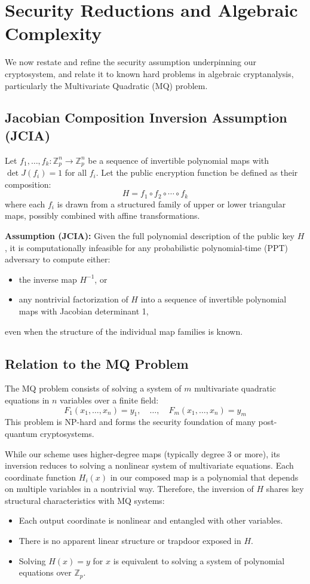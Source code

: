 \documentclass[12pt]{article}
\begin{document}
\section{Security Reductions and Algebraic Complexity}

We now restate and refine the security assumption underpinning our cryptosystem, and relate it to known hard problems in algebraic cryptanalysis, particularly the Multivariate Quadratic (MQ) problem.

\subsection*{Jacobian Composition Inversion Assumption (JCIA)}

Let \( f_1, \dots, f_k : \mathbb{Z}_p^n \rightarrow \mathbb{Z}_p^n \) be a sequence of invertible polynomial maps with \( \det J(f_i) = 1 \) for all \( f_i \). Let the public encryption function be defined as their composition:
\[
H = f_1 \circ f_2 \circ \cdots \circ f_k
\]
where each \( f_i \) is drawn from a structured family of upper or lower triangular maps, possibly combined with affine transformations.

\textbf{Assumption (JCIA):} Given the full polynomial description of the public key \( H \), it is computationally infeasible for any probabilistic polynomial-time (PPT) adversary to compute either:
\begin{itemize}
    \item the inverse map \( H^{-1} \), or
    \item any nontrivial factorization of \( H \) into a sequence of invertible polynomial maps with Jacobian determinant 1,
\end{itemize}
even when the structure of the individual map families is known.

\subsection*{Relation to the MQ Problem}

The MQ problem consists of solving a system of \( m \) multivariate quadratic equations in \( n \) variables over a finite field:
\[
F_1(x_1, \dots, x_n) = y_1, \quad \dots, \quad F_m(x_1, \dots, x_n) = y_m
\]
This problem is NP-hard and forms the security foundation of many post-quantum cryptosystems.

While our scheme uses higher-degree maps (typically degree 3 or more), its inversion reduces to solving a nonlinear system of multivariate equations. Each coordinate function \( H_i(x) \) in our composed map is a polynomial that depends on multiple variables in a nontrivial way. Therefore, the inversion of \( H \) shares key structural characteristics with MQ systems:
\begin{itemize}
    \item Each output coordinate is nonlinear and entangled with other variables.
    \item There is no apparent linear structure or trapdoor exposed in \( H \).
    \item Solving \( H(x) = y \) for \( x \) is equivalent to solving a system of polynomial equations over \( \mathbb{Z}_p \).
\end{itemize}
\end{document}
